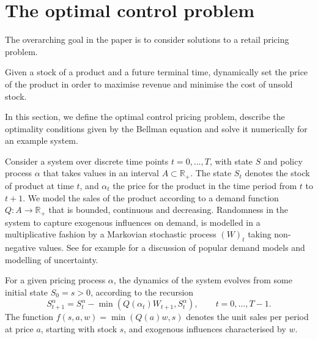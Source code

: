 \documentclass[main.tex]{subfiles}
\begin{document}
\listoftodos[Notes]

\section{The optimal control problem}
The overarching goal in the paper is to consider solutions to a retail
pricing problem.
\begin{mydef}
  Given a stock of a product and a future terminal time,
  dynamically set the price
  of the product in order to maximise revenue and minimise the cost of
  unsold stock.
\end{mydef}
In this section, we define the optimal control pricing problem,
describe the optimality conditions given by the Bellman equation and
solve it numerically for an example system.

Consider a system over discrete time points $t=0,\dots,T$, with state
$S$ and policy process $\alpha$ that takes values in an
interval $A\subset\mathbb R_+$.
The state $S_t$ denotes the stock of product at time $t$, and
$\alpha_t$ the price for the product in the time period from $t$ to
$t+1$. We model the sales of the product according to a demand
function $Q:A\to\mathbb R_+$ that is bounded, continuous and decreasing.
Randomness in the system to capture exogenous influences on demand, is
modelled in a multiplicative fashion by a Markovian stochastic process
$(W)_t$ taking non-negative values. See for example
\citet[Ch.~7]{talluri2006theory} for a discussion of
popular demand models and modelling of uncertainty.

For a given pricing process $\alpha$, the dynamics of
the system evolves from some initial state $S_0=s>0$, according to the
recursion
\begin{equation}\label{eq:stock_dynamics}
  S_{t+1}^\alpha=S_t^\alpha-\min(Q(\alpha_t)W_{t+1},S_t^\alpha),\qquad t=0,\dots,T-1.
\end{equation}
The function $f(s,a,w)=\min(Q(a)w,s)$ denotes the unit sales per
period at price $a$,
starting with stock $s$, and exogenous influences
characterised by $w$.
\end{document}
